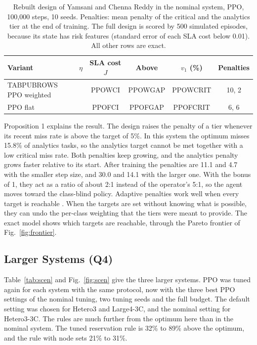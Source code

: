 \begin{table}[t]
\caption{Rebuilt design of Yamsani and Chenna Reddy \cite{yamsani2026} in the nominal system, PPO, 100,000 steps, 10 seeds. Penalties: mean penalty of the critical and the analytics tier at the end of training. The full design is scored by 500 simulated episodes, because its state has risk features (standard error of each SLA cost below 0.01). All other rows are exact.}
\label{tab:pub}
\centering
\footnotesize
\setlength{\tabcolsep}{2pt}
\begin{tabular}{@{}lccccc@{}}
\toprule
Variant & $\eta$ & SLA cost $J$ & Above & $v_1$ (\%) & Penalties \\
\midrule
TABPUBROWS
\midrule
PPO weighted & & PPOWCI & PPOWGAP & PPOWCRIT & 10, 2 \\
PPO flat & & PPOFCI & PPOFGAP & PPOFCRIT & 6, 6 \\
\bottomrule
\end{tabular}
\end{table}

Proposition 1 explains the result. The design raises the penalty of a tier whenever its recent miss rate is above the target of 5\%. In this system the optimum misses 15.8\% of analytics tasks, so the analytics target cannot be met together with a low critical miss rate. Both penalties keep growing, and the analytics penalty grows faster relative to its start. After training the penalties are 11.1 and 4.7 with the smaller step size, and 30.0 and 14.1 with the larger one. With the bonus of 1, they act as a ratio of about 2:1 instead of the operator's 5:1, so the agent moves toward the class-blind policy. Adaptive penalties work well when every target is reachable \cite{altman1999,tessler2019}. When the targets are set without knowing what is possible, they can undo the per-class weighting that the tiers were meant to provide. The exact model shows which targets are reachable, through the Pareto frontier of Fig.~\ref{fig:frontier}.

\subsection{Larger Systems (Q4)}
Table~\ref{tab:scen} and Fig.~\ref{fig:scen} give the three larger systems. PPO was tuned again for each system with the same protocol, now with the three best PPO settings of the nominal tuning, two tuning seeds and the full budget. The default setting was chosen for Hetero3 and Large4-3C, and the nominal setting for Hetero3-3C. The rules are much further from the optimum here than in the nominal system. The tuned reservation rule is 32\% to 89\% above the optimum, and the rule with node sets 21\% to 31\%.

